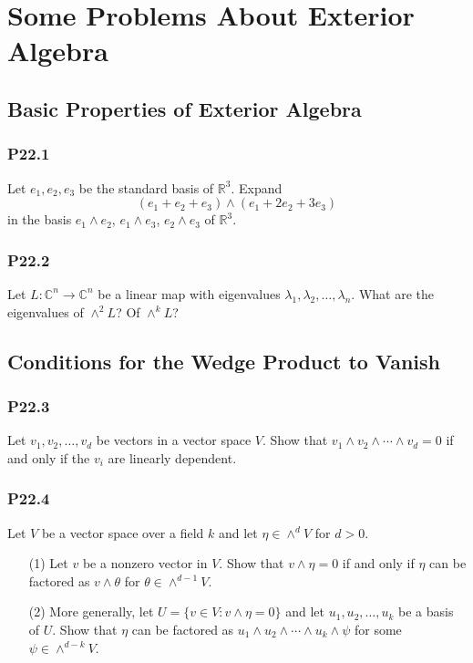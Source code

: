 \documentclass[lang=cn,11pt]{template}
\begin{document}
\chapter{Some Problems About Exterior Algebra}

\section{Basic Properties of Exterior Algebra}

\subsection*{P22.1}
Let \( e_1, e_2, e_3 \) be the standard basis of \( \mathbb{R}^3 \). Expand
\[
(e_1 + e_2 + e_3) \wedge (e_1 + 2e_2 + 3e_3)
\]
in the basis \( e_1 \wedge e_2 \), \( e_1 \wedge e_3 \), \( e_2 \wedge e_3 \) of \( \mathbb{R}^3 \).

\subsection*{P22.2}
Let \( L : \mathbb{C}^n \rightarrow \mathbb{C}^n \) be a linear map with eigenvalues \( \lambda_1, \lambda_2, \ldots, \lambda_n \). What are the eigenvalues of \( \wedge^2 L \)? Of \( \wedge^k L \)?

\section{Conditions for the Wedge Product to Vanish}

\subsection*{P22.3}
Let \( v_1, v_2, \ldots, v_d \) be vectors in a vector space \( V \). Show that \( v_1 \wedge v_2 \wedge \cdots \wedge v_d = 0 \) if and only if the \( v_i \) are linearly dependent.

\subsection*{P22.4}
Let \( V \) be a vector space over a field \( k \) and let \( \eta \in \wedge^d V \) for \( d > 0 \).
\begin{itemize}
    \item[(1)] Let \( v \) be a nonzero vector in \( V \). Show that \( v \wedge \eta = 0 \) if and only if \( \eta \) can be factored as \( v \wedge \theta \) for \( \theta \in \wedge^{d-1} V \).
    \item[(2)] More generally, let \( U = \{v \in V : v \wedge \eta = 0\} \) and let \( u_1, u_2, \ldots, u_k \) be a basis of \( U \). Show that \( \eta \) can be factored as \( u_1 \wedge u_2 \wedge \cdots \wedge u_k \wedge \psi \) for some \( \psi \in \wedge^{d-k} V \).
\end{itemize}
\end{document}
